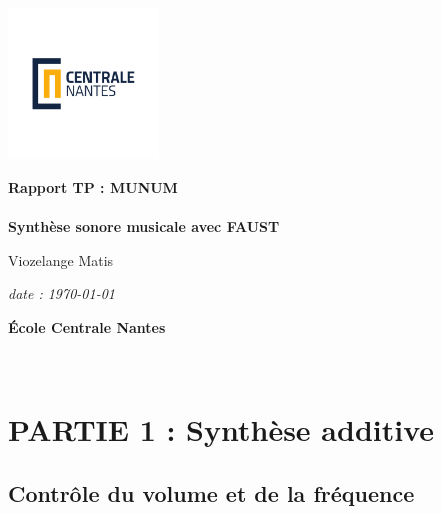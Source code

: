 \documentclass[12pt]{report}
\begin{document}
\renewcommand{\labelenumii}{\arabic{enumi}.\arabic{enumii}}

\begin{titlepage}
    \centering
    \vspace*{0cm}
    \includegraphics[width=0.3\textwidth]{imgs/LogoCN_Q.pdf}
    
    \vspace{3cm}
    
    \Huge\textbf{Rapport TP : MUNUM}\\
    \vspace{1cm}
    \Large\textbf{}\\
    
    \vspace{2cm}
    \Large\textbf{Synthèse sonore musicale avec FAUST}\\
    
    \vfill
    
    \Large{Viozelange Matis}\\
    \vspace{0.5cm}
    
    \vfill

    \vspace{2cm}
    
    \Large\textit{date : \today}\\
    
    \vspace{0.5cm}
    
    \Large\textbf{École Centrale Nantes}\\
    
    \vspace*{1cm}
\end{titlepage}


\newpage
\thispagestyle{empty}
~

\chapter{PARTIE 1 : Synthèse additive}

\section{Contrôle du volume et de la fréquence}
\end{document}
